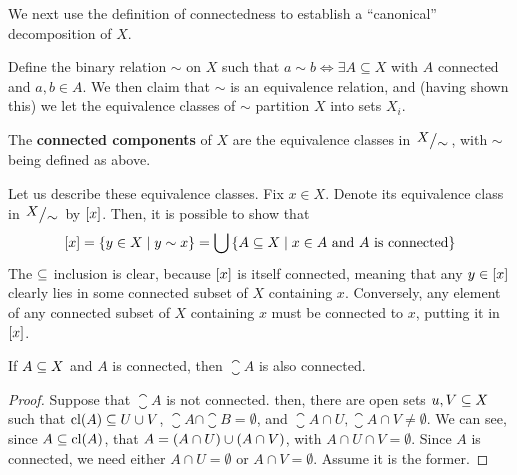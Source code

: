  We next use the definition of connectedness to establish a ``canonical'' decomposition of $X$.

 Define the binary relation $\sim$ on $X$ such that $a \sim b\iff \exists A\subseteq X$ with $A$ connected and $a,b \in A$. We then claim that $\sim$ is an equivalence relation, and (having shown this) we let the equivalence classes of $\sim$ partition $X$ into sets $X_i$.
 \begin{boxdefinition}
     The \textbf{connected components} of $X$ are the equivalence classes in $\quotient{X}{\sim}$, with $\sim$ being defined as above.
 \end{boxdefinition}

Let us describe these equivalence classes. Fix $x \in X$. Denote its equivalence class in $\quotient{X}{\sim}$ by $\left[ x \right]$. Then, it is possible to show that
\begin{align*}
    \left[ x \right] = \left\{ y \in X \; \middle\vert \; y \sim x \right\} = \bigcup\left\{ A \subseteq X \; \middle\vert \; x \in A \text{ and } A \text{ is connected} \right\}
\end{align*}
The $\subseteq$ inclusion is clear, because $\left[ x \right]$ is itself connected, meaning that any $y \in \left[ x \right]$ clearly lies in some connected subset of $X$ containing $x$. Conversely, any element of any connected subset of $X$ containing $x$ must be connected to $x$, putting it in $\left[ x \right]$.

\begin{boxlemma}\label{Ch1:Lemma:closure_connected_connected}
    If $A \subseteq X$ and $A$ is connected, then $\closure{A}$ is also connected.
\end{boxlemma}
\begin{proof} %
    Suppose that $\closure{A}$ is not connected. then, there are open sets $u, V \subseteq X$ such that $\operatorname{cl}\!\left( A \right) \subseteq U \cup V$, $\closure{A} \cap \closure{B} = \emptyset$, and $\closure{A} \cap U, \closure{A} \cap V \neq \emptyset$.  We can see, since $A \subseteq \operatorname{cl}\!\left( A \right)$, that $A = \left( A \cap U \right) \cup \left( A \cap V \right)$, with $A \cap U \cap V = \emptyset$. Since $A$ is connected, we need either $A \cap U = \emptyset$ or $A \cap V = \emptyset$. Assume it is the former. \sorry %
\end{proof}

